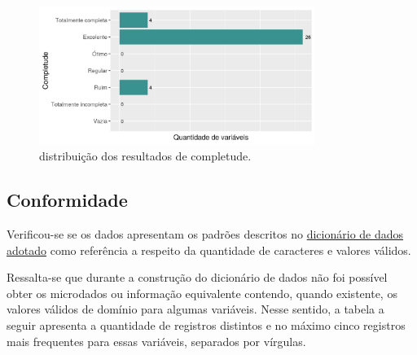 \documentclass[
  12,
]{proadi}
\begin{document}
\begin{figure}
\centering
\includegraphics[width=0.8\textwidth,height=\textheight]{imagens/comp.png}
\caption{distribuição dos resultados de completude.}
\end{figure}

\hypertarget{conformidade}{%
\subsection{Conformidade}\label{conformidade}}

Verificou-se se os dados apresentam os padrões descritos no
\protect\hyperlink{dicionuxe1rio-adotado}{dicionário de dados adotado}
como referência a respeito da quantidade de caracteres e valores
válidos.

Ressalta-se que durante a construção do dicionário de dados não foi
possível obter os microdados ou informação equivalente contendo, quando
existente, os valores válidos de domínio para algumas variáveis. Nesse
sentido, a tabela a seguir apresenta a quantidade de registros distintos
e no máximo cinco registros mais frequentes para essas variáveis,
separados por vírgulas.

\begingroup\fontsize{10}{12}\selectfont
\end{document}
